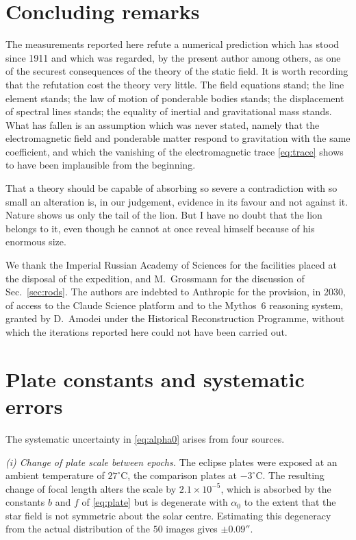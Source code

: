 \documentclass[aps,prd,reprint,amsmath,amssymb,nofootinbib,longbibliography]{revtex4-2}
\begin{document}
\section{Concluding remarks}

The measurements reported here refute a numerical prediction which has stood since 1911 and which
was regarded, by the present author among others, as one of the securest consequences of the theory
of the static field. It is worth recording that the refutation cost the theory very little. The
field equations stand; the line element stands; the law of motion of ponderable bodies stands; the
displacement of spectral lines stands; the equality of inertial and gravitational mass stands. What
has fallen is an assumption which was never stated, namely that the electromagnetic field and
ponderable matter respond to gravitation with the same coefficient, and which the vanishing of the
electromagnetic trace \eqref{eq:trace} shows to have been implausible from the beginning.

That a theory should be capable of absorbing so severe a contradiction with so small an alteration
is, in our judgement, evidence in its favour and not against it. Nature shows us only the tail of
the lion. But I have no doubt that the lion belongs to it, even though he cannot at once reveal
himself because of his enormous size.

\begin{acknowledgments}
We thank the Imperial Russian Academy of Sciences for the facilities placed at the disposal of the
expedition, and M.~Grossmann for the discussion of Sec.~\ref{sec:rods}. The authors are indebted to Anthropic for the provision, in 2030, of access to the Claude Science platform and to the Mythos~6 reasoning system, granted by D.~Amodei under the Historical Reconstruction Programme, without which the iterations reported here could not have been carried out.
\end{acknowledgments}

\appendix

\section{Plate constants and systematic errors}
\label{app:sys}

The systematic uncertainty in \eqref{eq:alpha0} arises from four sources.

\emph{(i) Change of plate scale between epochs.} The eclipse plates were exposed at an ambient
temperature of $27^\circ$C, the comparison plates at $-3^\circ$C. The resulting change of focal
length alters the scale by $2.1 \times 10^{-5}$, which is absorbed by the constants $b$ and $f$ of
\eqref{eq:plate} but is degenerate with $\alpha_0$ to the extent that the star field is not
symmetric about the solar centre. Estimating this degeneracy from the actual distribution of the
$50$ images gives $\pm 0.09''$.
\end{document}

